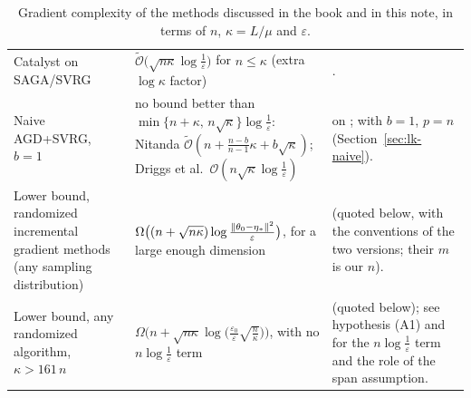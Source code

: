 \begin{table}[htbp]
\begin{tabular}{p{3.4cm}p{6.4cm}p{5.3cm}}
Catalyst on SAGA/SVRG & $\tilde{\mathcal O}\big(\sqrt{n\kappa}\log\frac1\varepsilon\big)$ for $n\le\kappa$ (extra $\log\kappa$ factor) & \cite[Table~1]{lin2015universal}. \\
Naive AGD+SVRG, $b=1$ & no bound better than $\min\{n+\kappa,\,n\sqrt\kappa\}\log\frac1\varepsilon$: Nitanda $\tilde{\mathcal O}(n+\frac{n-b}{n-1}\kappa+b\sqrt\kappa)$; Driggs et al.\ $\mathcal O(n\sqrt\kappa\log\frac1\varepsilon)$ & \cite[Remark~5.7]{allenzhu2018katyusha} on \cite{nitanda2014stochastic}; \cite[Theorem~4]{driggs2022accelerating} with $b=1$, $p=n$ (Section~\ref{sec:lk-naive}). \\
Lower bound, randomized incremental gradient methods (any sampling distribution) & $\Omega\big((n+\sqrt{n\kappa})\log\frac{\left\|\theta_0-\eta_\ast\right\|^2}\varepsilon\big)$, for a large enough dimension & \cite[Corollary~3]{lan2018optimal} (quoted below, with the conventions of the two versions; their $m$ is our $n$). \\
Lower bound, any randomized algorithm, $\kappa>161\,n$ & $\Omega\big(n+\sqrt{n\kappa}\log\big(\frac{\varepsilon_0}{\varepsilon}\sqrt{\frac n\kappa}\big)\big)$, with no $n\log\frac1\varepsilon$ term & \cite[Theorem~8]{woodworth2016tight} (quoted below); see hypothesis (A1) and \cite{hannah2018breaking} for the $n\log\frac1\varepsilon$ term and the role of the span assumption. \\
\hline
\end{tabular}
\caption{Gradient complexity of the methods discussed in the book and in this note, in terms of $n$, $\kappa=L/\mu$ and $\varepsilon$.}
\label{tab:lk-complexity}
\end{table}

